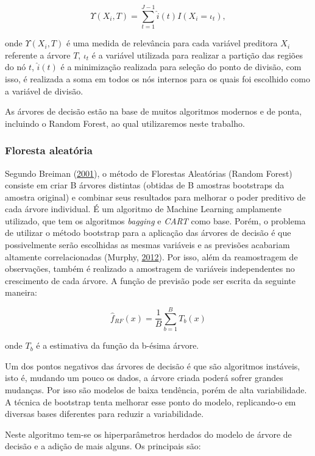 \documentclass[
	12pt,				%
	a4paper,		%
	oneside,    %
	chapter=TITLE,		   %
	section=TITLE,		   %
	subsection=TITLE,	   %
	subsubsection=TITLE, %
	english,			%
	french,				%
	spanish,			%
	brazil,				%
]{abntex2}
\begin{document}
\[
\Upsilon(X_i, T)= \sum_{t=1}^{J-1} \hat{i}(t) I(X_i=\iota_t),
\]

\noindent onde \(\Upsilon(X_i, T)\) é uma medida de relevância para cada
variável preditora \(X_i\) referente a árvore \(T\), \(\iota_t\) é a
variável utilizada para realizar a partição das regiões do nó \(t\),
\(\hat{i}(t)\) é a minimização realizada para seleção do ponto de
divisão, com isso, é realizada a soma em todos os nós internos para os
quais foi escolhido como a variável de divisão.

As árvores de decisão estão na base de muitos algoritmos modernos e de
ponta, incluindo o Random Forest, ao qual utilizaremos neste trabalho.

\hypertarget{floresta-aleatuxf3ria}{%
\subsubsection{Floresta aleatória}\label{floresta-aleatuxf3ria}}

Segundo Breiman (\protect\hyperlink{ref-breiman2001random}{2001}), o
método de Florestas Aleatórias (Random Forest) consiste em criar B
árvores distintas (obtidas de B amostras bootstraps da amostra original)
e combinar seus resultados para melhorar o poder preditivo de cada
árvore individual. É um algoritmo de Machine Learning amplamente
utilizado, que tem os algoritmos \emph{bagging} e \emph{CART} como base.
Porém, o problema de utilizar o método bootstrap para a aplicação das
árvores de decisão é que possivelmente serão escolhidas as mesmas
variáveis e as previsões acabariam altamente correlacionadas (Murphy,
\protect\hyperlink{ref-murphy2012probabilistic}{2012}). Por isso, além
da reamostragem de observações, também é realizado a amostragem de
variáveis independentes no crescimento de cada árvore. A função de
previsão pode ser escrita da seguinte maneira:

\[
\hat{f}_{RF}(x) = \frac{1}{B}\sum_{b=1}^BT_b(x)
\]

\noindent onde \(T_b\) é a estimativa da função da b-ésima árvore.

Um dos pontos negativos das árvores de decisão é que são algoritmos
instáveis, isto é, mudando um pouco os dados, a árvore criada poderá
sofrer grandes mudanças. Por isso são modelos de baixa tendência, porém
de alta variabilidade. A técnica de bootstrap tenta melhorar esse ponto
do modelo, replicando-o em diversas bases diferentes para reduzir a
variabilidade.

Neste algoritmo tem-se os hiperparâmetros herdados do modelo de árvore
de decisão e a adição de mais alguns. Os principais são:
\end{document}
